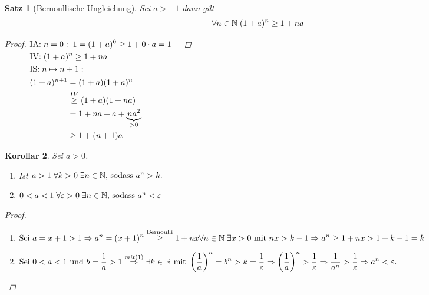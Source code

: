 \documentclass[a4paper,titlepage,oneside]{article}
\def\N{\ensuremath{\mathbb{N}} }
\def\R{\ensuremath{\mathbb{R}} }
\renewcommand{\epsilon}{\ensuremath{\varepsilon} }
\newcommand{\IA}[1][n=0]{\vspace{0.1pt}\ensuremath{\text{IA:}\sp#1:}}
\newcommand{\IV}{\vspace{0.1pt}\ensuremath{\text{IV:}\sp}}
\newcommand{\IS}[1][n \mapsto n+1]{\vspace{0.1pt}\ensuremath{\text{IS:}\sp#1:}}
\def\fa{\ensuremath{\forall}}
\def\sp{\hspace{0,1cm}}
\theoremstyle{thmstyle}
\theoremstyle{subthmstyle}
\newtheorem{subsatz}{Satz}[subsection]
\newtheorem{subkorr}[subsatz]{Korollar}
\begin{document}
\begin{subsatz}[Bernoullische Ungleichung]
Sei \(a > -1\) dann gilt \[\fa n \in \N \sp (1+a)^n \ge 1 + na \]
\begin{proof}
\begin{math}
\begin{aligned}[t]
	&\IA \sp 1 = (1 + a)^0 \ge 1 + 0\cdot a = 1						&&\\
	&\IV (1+a)^n \ge 1 + na								&&\\
	&\IS \\
	&\begin{aligned}[t]
		(1+a)^{n+1} 	&= (1+a)(1+a)^n 					&&\\
					&\overset{IV}{\ge} (1 + a)(1 + na) 		&&\\
					&= 1 + na + a + \underbrace{na^2}_{> 0} 	&&\\
					&\ge 1 + (n+1)a \end{aligned}
\end{aligned}\\
\end{math}
\end{proof}
\end{subsatz}

\begin{subkorr}
Sei \(a > 0\).
\begin{enumerate}[label=(\arabic*)]
	\item Ist \sp \(a > 1 \sp \forall k > 0 \sp \exists n \in \N \text{, sodass }a^n > k.\)
	\item \(0 < a < 1 \sp \forall \epsilon > 0 \sp \exists n \in \N \text{, sodass }a^n < \epsilon\)
\end{enumerate}
\begin{proof}\sp
\begin{enumerate}[label=(\arabic*)]
	\item \begin{math} \displaystyle
		\text{Sei } a = x + 1 > 1 \Rightarrow a^n = (x + 1)^n \overset{\text{Bernoulli}}{\ge} 1 + nx \\
		\forall n \in \N \sp \exists x > 0 \text{ mit } nx > k - 1 \Rightarrow a^n \ge 1 + nx > 1 + k -1 = k
		\end{math}
	\item \begin{math} \displaystyle
		\text{Sei } 0 < a < 1 \text{ und } b = \frac{1}{a} > 1 \overset{mit (1)}{\Rightarrow} \exists k \in \R \text{ mit }  \left(\frac{1}{a}\right)^n = b^n > k = \frac{1}{\epsilon}\\
		\Rightarrow  \left(\frac{1}{a}\right)^n > \frac{1}{\epsilon} \Rightarrow  \frac{1}{a^n} > \frac{1}{\epsilon} \Rightarrow a^n < \epsilon.
		\end{math}
\end{enumerate}
\end{proof}
\end{subkorr}
\end{document}
